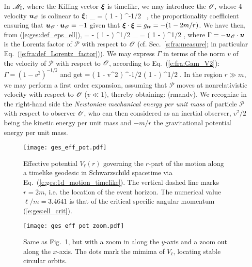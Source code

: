 In $\mathscr{M}_{\rm I}$, where the Killing vector $\bm{\xi}$ is timelike,
we may introduce the 
$\mathscr{O}$, whose 4-velocity $\bm{u}_{\mathscr{O}}$ is colinear to $\bm{\xi}$:
\be
    _{\Obs} = \left( 1 -  \right) ^{-1/2} \, \w{\xi} ,
\ee
the proportionality coefficient ensuring that $\bm{u}_{\mathscr{O}}\cdot\bm{u}_{\mathscr{O}}=-1$
given that $\bm{\xi}\cdot\bm{\xi} = g_{tt} = - (1-2m/r)$.
We have then, from (\ref{e:ges:def_eps_ell}),
\be
    \veps = - \left( 1 -  \right) ^{1/2} _{\Obs}\cdot{}
        = \Gamma \left( 1 -  \right) ^{1/2} ,
\ee
where $\Gamma = - \bm{u}_{\mathscr{O}}\cdot\bm{u}$ is the Lorentz factor of $\mathscr{P}$
with respect to $\mathscr{O}$ (cf. Sec.~\ref{s:fra:measure}; in particular Eq.~(\ref{e:fra:def_Lorentz_factor})). We may express $\Gamma$ in terms of the norm $v$ of the
velocity of $\mathscr{P}$ with respect to $\mathscr{O}$, according to Eq.~(\ref{e:fra:Gam_V2}):
$\Gamma = (1-v^2)^{-1/2}$ and get
\be
    \veps = \left( 1 - v^2 \right) ^{-1/2} \left( 1 -  \right) ^{1/2}  .
\ee
In the region $r\gg m$, we may perform a first order expansion, assuming
that  $\mathscr{P}$ moves at nonrelativistic velocity with respect to $\mathscr{O}$
($v\ll 1$), thereby obtaining:
\be \label{e:ges:veps_far}
     \qquad
    \left(r\gg m\quad\mbox{and}\quad v\right).
\ee
We recognize in the right-hand side the \emph{Newtonian mechanical energy per
unit mass} of particle $\mathscr{P}$ with respect to observer $\mathscr{O}$, who can
then considered as an inertial observer, $v^2/2$ being the kinetic energy per unit mass
and $-m/r$ the gravitational potential energy per unit mass.

\begin{figure}
\centerline{\texttt{[image: ges\_eff\_pot.pdf]}}
\caption[]{\label{f:ges:eff_pot} \footnotesize
Effective potential $V_{\ell}(r)$ governing the $r$-part of the
motion along a timelike geodesic in
Schwarzschild spacetime via Eq.~(\ref{e:ges:1d_motion_timelike}).
The vertical dashed line marks $r=2m$, i.e. the
location of the event horizon.
The numerical value $\ell/m=3.4641$ is that of the critical
specific angular momentum (\ref{e:ges:ell_crit}).}
\end{figure}

\begin{figure}
\centerline{\texttt{[image: ges\_eff\_pot\_zoom.pdf]}}
\caption[]{\label{f:ges:eff_pot_zoom} \footnotesize
Same as Fig.~\ref{f:ges:eff_pot}, but with a zoom in along the $y$-axis
and a zoom out along the $x$-axis. The dots mark the mimima of
$V_{\ell}$, locating stable circular orbits.}
\end{figure}

